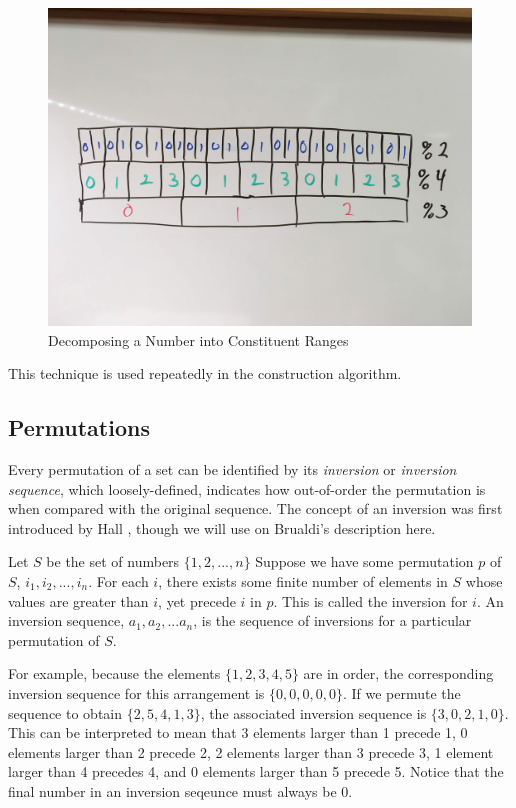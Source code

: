 \begin{figure}[t]
\centering
\centerline{\includegraphics[origin=c,width=12cm]{../figures/interval-breakdown.jpg}}
\caption{Decomposing a Number into Constituent Ranges}
\label{fig:interval_breakdown}
\end{figure}

This technique is used repeatedly in the construction algorithm.

\subsection{Permutations}

Every permutation of a set can be identified by its \textit{inversion} or \textit{inversion sequence}, which loosely-defined, indicates how out-of-order the permutation is when compared with the original sequence. The concept of an inversion was first introduced by Hall \cite{hall_automorphisms_1962}, though we will use on Brualdi's description \cite{brualdi_introductory_2010} here.

Let $S$ be the set of numbers $\{1, 2, ..., n\}$ Suppose we have some permutation $p$ of $S$, $i_1, i_2, ..., i_n$. For each $i$, there exists some finite number of elements in $S$ whose values are greater than $i$, yet precede $i$ in $p$. This is called the inversion for $i$. An inversion sequence, $a_1, a_2, ... a_n$, is the sequence of inversions for a particular permutation of $S$.

For example, because the elements $\{1, 2, 3, 4, 5\}$ are in order, the corresponding inversion sequence for this arrangement is $\{0, 0, 0, 0, 0\}$. If we permute the sequence to obtain $\{2, 5, 4, 1, 3\}$, the associated inversion sequence is $\{3, 0, 2, 1, 0\}$. This can be interpreted to mean that 3 elements larger than 1 precede 1, 0 elements larger than 2 precede 2, 2 elements larger than 3 precede 3, 1 element larger than 4 precedes 4, and 0 elements larger than 5 precede 5. Notice that the final number in an inversion seqeunce must always be 0.

